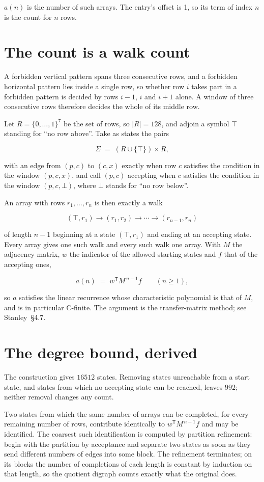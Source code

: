 \documentclass[11pt]{article}
\theoremstyle{definition}
\begin{document}
$a(n)$ is the number of such arrays. The entry's offset is 1, so its term of index $n$ is the count for $n$ rows.

\section{The count is a walk count}

A forbidden vertical pattern spans three consecutive rows, and a forbidden horizontal pattern lies inside a single row, so whether row $i$ takes part in a forbidden pattern is decided by rows $i-1$, $i$ and $i+1$ alone. A window of three consecutive rows therefore decides the whole of its middle row.

Let $R = \{0,\dots,1\}^{7}$ be the set of rows, so $|R| = 128$, and adjoin a symbol $\top$ standing for ``no row above''. Take as states the pairs

\[\Sigma \;=\; (R \cup \{\top\}) \times R,\]

with an edge from $(p,c)$ to $(c,x)$ exactly when row $c$ satisfies the condition in the window $(p,c,x)$, and call $(p,c)$ accepting when $c$ satisfies the condition in the window $(p,c,\bot)$, where $\bot$ stands for ``no row below''.

An array with rows $r_1,\dots,r_n$ is then exactly a walk

\[(\top,r_1) \to (r_1,r_2) \to \cdots \to (r_{n-1},r_n)\]

of length $n-1$ beginning at a state $(\top,r_1)$ and ending at an accepting state. Every array gives one such walk and every such walk one array. With $M$ the adjacency matrix, $w$ the indicator of the allowed starting states and $f$ that of the accepting ones,

\[a(n) \;=\; w^{\mathsf T} M^{\,n-1} f \qquad (n \ge 1),\]

so $a$ satisfies the linear recurrence whose characteristic polynomial is that of $M$, and is in particular C-finite. The argument is the transfer-matrix method; see Stanley~\S4.7.

\section{The degree bound, derived}

The construction gives $16512$ states. Removing states unreachable from a start state, and states from which no accepting state can be reached, leaves $992$; neither removal changes any count.

Two states from which the same number of arrays can be completed, for every remaining number of rows, contribute identically to $w^{\mathsf T}M^{\,n-1}f$ and may be identified. The coarsest such identification is computed by partition refinement: begin with the partition by acceptance and separate two states as soon as they send different numbers of edges into some block. The refinement terminates; on its blocks the number of completions of each length is constant by induction on that length, so the quotient digraph counts exactly what the original does.
\end{document}

